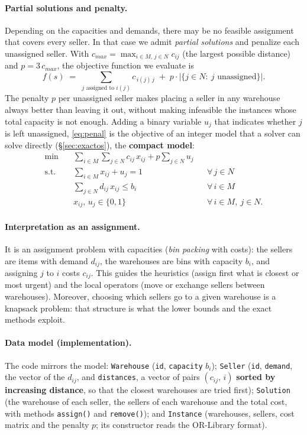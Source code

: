 \documentclass[11pt,a4paper]{article}
\newcommand{\code}[1]{\texttt{#1}}
\begin{document}
\paragraph{Partial solutions and penalty.} Depending on the capacities and demands, there may be
no feasible assignment that covers every seller. In that case we admit \emph{partial solutions}
and penalize each unassigned seller. With $c_{max}=\max_{i\in M,\,j\in N} c_{ij}$ (the largest
possible distance) and $p=3\,c_{max}$, the objective function we evaluate is
\begin{equation}
  f(s)\;=\;\sum_{j \text{ assigned to } i(j)} c_{\,i(j)\,j}\;+\;p\cdot\bigl|\{j\in N:\ j\text{ unassigned}\}\bigr|.
  \label{eq:penal}
\end{equation}
The penalty $p$ per unassigned seller makes placing a seller in any warehouse always better than
leaving it out, without making infeasible the instances whose total capacity is not enough.
Adding a binary variable $u_j$ that indicates whether $j$ is left unassigned, \eqref{eq:penal} is
the objective of an integer model that a solver can solve directly (\S\ref{sec:exactos}), the
\textbf{compact model}:
\begin{align}
  \min \quad & \sum_{i\in M}\sum_{j\in N} c_{ij}\,x_{ij} + p\sum_{j\in N} u_j \label{eq:compacto}\\
  \text{s.t.}\quad & \sum_{i\in M} x_{ij} + u_j = 1 && \forall\, j\in N \label{eq:asigu}\\
  & \sum_{j\in N} d_{ij}\,x_{ij} \le b_i && \forall\, i\in M \nonumber\\
  & x_{ij},\,u_j\in\{0,1\} && \forall\, i\in M,\ j\in N. \nonumber
\end{align}

\paragraph{Interpretation as an assignment.} It is an assignment problem with capacities
(\emph{bin packing} with costs): the sellers are items with demand $d_{ij}$, the warehouses are
bins with capacity $b_i$, and assigning $j$ to $i$ costs $c_{ij}$. This guides the heuristics
(assign first what is closest or most urgent) and the local operators (move or exchange sellers
between warehouses). Moreover, choosing which sellers go to a given warehouse is a knapsack
problem: that structure is what the lower bounds and the exact methods exploit.

\paragraph{Data model (implementation).} The code mirrors the model: \code{Warehouse} (\code{id},
\code{capacity} $b_i$); \code{Seller} (\code{id}, \code{demand}, the vector of the $d_{ij}$, and
\code{distances}, a vector of pairs $(c_{ij},\,i)$ \textbf{sorted by increasing distance}, so that
the closest warehouses are tried first); \code{Solution} (the warehouse of each seller, the sellers
of each warehouse and the total cost, with methods \code{assign()} and \code{remove()}); and
\code{Instance} (warehouses, sellers, cost matrix and the penalty $p$; its constructor reads the
OR-Library format).
\end{document}
